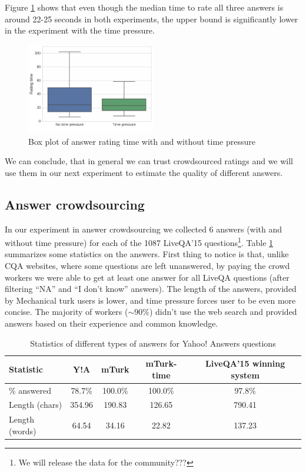 \documentclass[11pt,letterpaper]{article}
\begin{document}
Figure \ref{figure:validation_time} shows that even though the median time to rate all three answers is around 22-25 seconds in both experiments, the upper bound is significantly lower in the experiment with the time pressure.

\begin{figure}[t!]
	\centering
	\includegraphics[width=0.5\textwidth]{img/validation_time}
	\caption{Box plot of answer rating time with and without time pressure}
	\label{figure:validation_time}
\end{figure}

We can conclude, that in general we can trust crowdsourced ratings and we will use them in our next experiment to estimate the quality of different answers.

\subsection{Answer crowdsourcing}
\label{subsec:results:answer_crowd}

In our experiment in answer crowdsourcing we collected 6 answers (with and without time pressure) for each of the 1087 LiveQA'15 questions\footnote{We will release the data for the community???}.
Table \ref{table:answer_stats} summarizes some statistics on the answers.
First thing to notice is that, unlike CQA websites, where some questions are left unanswered, by paying the crowd workers we were able to get at least one answer for all LiveQA questions (after filtering ``NA'' and ``I don't know'' answers).
The length of the answers, provided by Mechanical turk users is lower, and time pressure forces user to be even more concise.
The majority of workers ($\sim90 \%$) didn't use the web search and provided answers based on their experience and common knowledge.

\begin{table}[h!t]
\centering
\caption{Statistics of different types of answers for Yahoo! Answers questions}
\begin{tabular}{| p{3cm} | c | c | c | c |}
\hline
Statistic & Y!A & mTurk & mTurk-time & LiveQA'15 winning system\\
\hline
\% answered & 78.7\% & 100.0\% & 100.0\% & 97.8\% \\
Length (chars) & 354.96 & 190.83 & 126.65 & 790.41 \\
Length (words) & 64.54 & 34.16 & 22.82 & 137.23 \\
\hline
\end{tabular}
\label{table:answer_stats}
\end{table}
\end{document}
